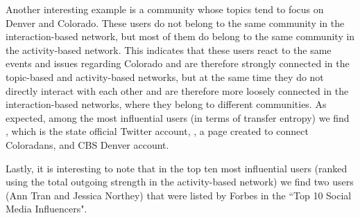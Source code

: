 Another interesting example is a community whose topics tend to focus on Denver and Colorado. These users do not belong to the same community in the interaction-based network, but most of them do belong to the same community in the activity-based network. This indicates that these users react to the same events and issues regarding Colorado and are therefore strongly connected in the topic-based and activity-based networks, but at the same time they do not directly interact with each other and are therefore more loosely connected in the interaction-based networks, where they belong to different communities. As expected, among the most influential users (in terms of transfer entropy) we find \@Colorado, which is the state official Twitter account, \@ConnectColorado, a page created to connect Coloradans, and CBS Denver account.

Lastly, it is interesting to note that in the top ten most influential users (ranked using the total outgoing strength in the activity-based network) we find two users (Ann Tran and Jessica Northey) that were listed by Forbes in the ``Top 10 Social Media Influencers".
